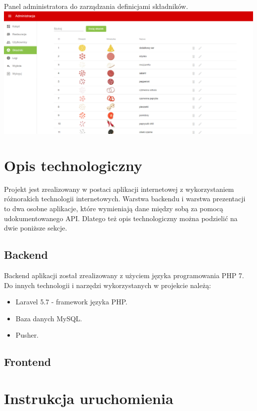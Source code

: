 \documentclass[12pt]{article}
\begin{document}
\clearpage

Panel administratora do zarządzania definicjami składników. \\

\includegraphics[width=16cm]{admin}

\clearpage
\vspace{1cm}
\section{Opis technologiczny}
\vspace{1cm}
Projekt jest zrealizowany w postaci aplikacji internetowej z wykorzystaniem różnorakich technologii internetowych.
Warstwa backendu i warstwa prezentacji to dwa osobne aplikacje, które wymieniają dane między sobą za pomocą udokumentowanego API. Dlatego też opis technologiczny można podzielić na dwie poniższe sekcje.

\subsection{Backend}

Backend aplikacji został zrealizowany z użyciem języka programowania PHP 7. Do innych technologii i narzędzi wykorzystanych w projekcie należą:
\begin{itemize}
	\item Laravel 5.7 - framework języka PHP.
	\item Baza danych MySQL.
	\item Pusher.
\end{itemize}

\subsection{Frontend}
\clearpage

\section{Instrukcja uruchomienia}
\vspace{1cm}
\end{document}
